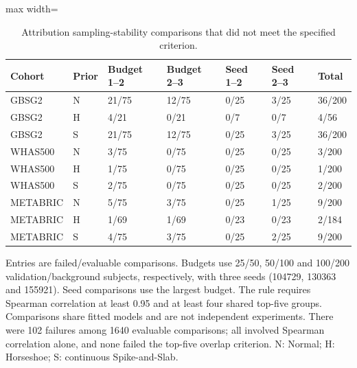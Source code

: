 \begin{table}[htbp]
\centering
\begingroup\singlespacing\footnotesize
\setlength{\tabcolsep}{3pt}
\caption{Attribution sampling-stability comparisons that did not meet the specified criterion.}\label{tab:exam-attribution-failures}
\begin{adjustbox}{max width=\textwidth}
\begin{tabular}{@{}lllllll@{}}
\toprule Cohort & Prior & Budget 1--2 & Budget 2--3 & Seed 1--2 & Seed 2--3 & Total\\\midrule
GBSG2 & N & 21/75 & 12/75 & 0/25 & 3/25 & 36/200\\
GBSG2 & H & 4/21 & 0/21 & 0/7 & 0/7 & 4/56\\
GBSG2 & S & 21/75 & 12/75 & 0/25 & 3/25 & 36/200\\
WHAS500 & N & 3/75 & 0/75 & 0/25 & 0/25 & 3/200\\
WHAS500 & H & 1/75 & 0/75 & 0/25 & 0/25 & 1/200\\
WHAS500 & S & 2/75 & 0/75 & 0/25 & 0/25 & 2/200\\
METABRIC & N & 5/75 & 3/75 & 0/25 & 1/25 & 9/200\\
METABRIC & H & 1/69 & 1/69 & 0/23 & 0/23 & 2/184\\
METABRIC & S & 4/75 & 3/75 & 0/25 & 2/25 & 9/200\\
\bottomrule
\end{tabular}
\end{adjustbox}
\par\smallskip
\begin{minipage}{\textwidth}
Entries are failed/evaluable comparisons. Budgets use 25/50, 50/100 and 100/200 validation/background subjects, respectively, with three seeds (104729, 130363 and 155921). Seed comparisons use the largest budget. The rule requires Spearman correlation at least 0.95 and at least four shared top-five groups. Comparisons share fitted models and are not independent experiments. There were 102 failures among 1640 evaluable comparisons; all involved Spearman correlation alone, and none failed the top-five overlap criterion. N: Normal; H: Horseshoe; S: continuous Spike-and-Slab.
\end{minipage}
\endgroup
\end{table}
